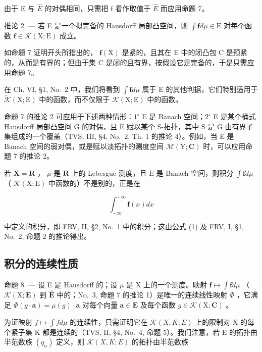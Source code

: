由于 E 与 \(\widehat{E}\) 的对偶相同，只需把 f 看作取值于 \(\widehat{E}\) 而应用命题 7。

推论 2. --- 若 E 是一个拟完备的 Hausdorff 局部凸空间，则 \(\int \mathbf{f} d\mu \in \mathrm{E}\) 对每个函数 \(\mathbf{f} \in \mathcal{K}(\mathrm{X};\mathrm{E})\) 成立。

如命题 7 证明开头所指出的， \(\mathbf{f}(\mathrm{X})\) 是紧的，且其在 E 中的闭凸包 C 是预紧的，从而是有界的；但由于集 C 是闭的且有界，按假设它是完备的，于是只需应用命题 7。

在 Ch. VI, §1, No.~2 中，我们将看到 \(\int \mathbf{f} d\mu\) 属于 E 的其他判据，它们特别适用于 \(\widetilde{\mathcal{K}}(\mathrm{X};\mathrm{E})\) 中的函数，而不仅限于 \(\mathcal{K}(\mathrm{X};\mathrm{E})\) 中的函数。

命题 7 的推论 2 可应用于下述两种情形：\(1^{\circ}\) E 是 Banach 空间；\(2^{\circ}\) E 是某个桶式 Hausdorff 局部凸空间 G 的对偶，且 E 赋以某个 S-拓扑，其中 S 是 G 由有界子集组成的一个覆盖（TVS, III, §4, No.~2, Th. 1 的推论 4）。例如，当 E 是 Banach 空间的弱对偶，或是赋以淡拓扑的测度空间 \(\mathcal{M}(\mathrm{Y};\mathbf{C})\) 时，可以应用命题 7 的推论 2。

若 \(\mathbf{X} = \mathbf{R}\) ， \(\mu\) 是 \(\mathbf{R}\) 上的 Lebesgue 测度，且 \(\mathrm{E}\) 是 Banach 空间，则积分 \(\int \mathbf{f} d\mu\) （ \(\mathcal{K}(\mathrm{X};\mathrm{E})\) 中函数的）不是别的，正是在

\[
\int_ {- \infty} ^ {+ \infty} \mathbf {f} (x) d x
\]

中定义的积分，即 FRV, II, §2, No.~1 中的积分；这由公式 (1) 及 FRV, I, §1, No.~2, 命题 2 的推论得出。

\subsection{积分的连续性质}

命题 8. --- 设 E 是 Hausdorff 的；设 \(\mu\) 是 X 上的一个测度。映射 \(\mathbf{f} \mapsto \int \mathbf{f} d\mu\) （ \(\mathcal{K}(\mathrm{X};\mathbf{E})\) 到 \(\widehat{\mathbf{E}}\) 中的；No.~3, 命题 7 的推论 1）是唯一的连续线性映射 \(\Phi\) ，它满足 \(\Phi(g \cdot \mathbf{a}) = \mu(g) \cdot \mathbf{a}\) 对每个向量 \(\mathbf{a} \in \mathbf{E}\) 及每个函数 \(g \in \mathcal{K}(\mathrm{X};\mathbf{C})\) 。

为证映射 \(f \mapsto \int f d\mu\) 的连续性，只需证明它在 \(\mathcal{K}(X, K; E)\) 上的限制对 X 的每个紧子集 K 都是连续的（TVS, II, §4, No.~4, 命题 5）。我们注意，若 E 的拓扑由半范数族 \((q_{\alpha})\) 定义，则 \(\mathcal{K}(X, K; E)\) 的拓扑由半范数族

